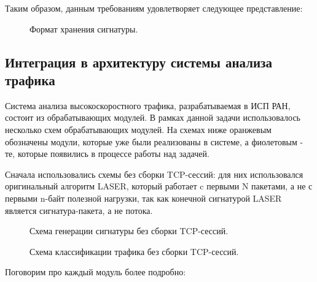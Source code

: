 Таким образом, данным требованиям удовлетворяет следующее представление:


\begin{figure}[H]
    \begin{center}
        
        \caption{Формат хранения сигнатуры.}
    \end{center}
\end{figure}


\subsection{Интеграция в архитектуру системы анализа трафика}

Система анализа высокоскоростного трафика, разрабатываемая в ИСП РАН, состоит из обрабатывающих модулей. В рамках данной задачи использовалось несколько схем обрабатывающих модулей.
На схемах ниже оранжевым обозначены модули, которые уже были реализованы в системе, а фиолетовым - те, которые появились в процессе работы над задачей.

Сначала использовались схемы без сборки TCP-сессий: для них использовался оригинальный алгоритм LASER,
который работает c первыми N пакетами, а не с первыми n-байт полезной нагрузки, так как конечной сигнатурой LASER является сигнатура-пакета, а не потока.

\begin{figure}[H]
    \begin{center}
        
        \caption{Схема генерации сигнатуры без сборки TCP-сессий.}
    \end{center}
\end{figure}

\begin{figure}[H]
    \begin{center}
        
        \caption{Схема классификации трафика без сборки TCP-сессий.}
    \end{center}
\end{figure}

Поговорим про каждый модуль более подробно:

